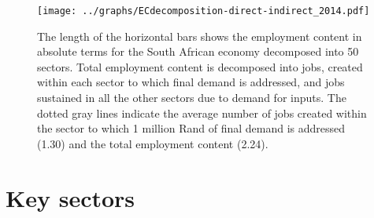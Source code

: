 \documentclass[12pt,english]{article}
\begin{document}
\begin{figure}[!ht]
	\centering
	\thispagestyle{empty}
	\texttt{[image: ../graphs/ECdecomposition-direct-indirect\_2014.pdf]}
	\caption{\label{Decomposition_direct_indirect_absolute} The length of the horizontal bars shows the employment content in absolute terms for the South African economy decomposed into 50 sectors. %
		Total employment content is decomposed into jobs, created within each sector to which final demand is addressed, and jobs sustained in all the other sectors due to demand for inputs. The dotted gray lines indicate the average number of jobs created within the sector to which 1 million Rand of final demand is addressed (1.30) and the total employment content (2.24).}
\end{figure}	


\clearpage
\section{Key sectors}
%
%
%
\end{document}
